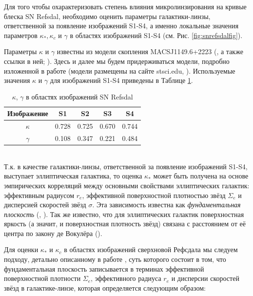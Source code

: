 Для того чтобы охарактеризовать степень влияния микролинзирования на кривые блеска SN Refsdal, необходимо оценить параметры галактики-линзы, ответственной за появление изображений S1-S4, а именно локальные значения параметров $\kappa_*, \kappa_c$ и $\gamma$ в областях изображений S1-S4  (см. Рис. \ref{fig:snrefsdalfig}). 

Параметры $\kappa$ и $\gamma$ известны из модели скопления MACSJ1149.6+2223 (\cite{treu2015}, а также ссылки в ней; \cite{hubblemaps}). Здесь и далее мы будем придерживаться модели, подробно изложенной в работе \cite{kawamataoguri} (модели размещены на сайте stsci.edu, \cite{hlsp}). Используемые значения $\kappa$ и $\gamma$ для изображений S1-S4 приведены в Таблице \ref{tab:kappagamma}.

\begin{table}[h!]
  \caption{$\kappa$, $\gamma$ в областях изображений SN Refsdal}
  \label{tab:kappagamma}
  \centering
    \begin{tabular}{ | c | c | c | c | c |}
    \hline
    Изображение & S1 & S2 & S3 & S4 \\ \hline
    $\kappa$ & 0.728 & 0.725 & 0.670 & 0.744 \\ \hline
    $\gamma$ & 0.108 & 0.347 & 0.221 & 0.484 \\
    \hline
    \end{tabular}
\end{table}
\\
Т.к. в качестве галактики-линзы, ответственной за появление изображений S1-S4, выступает эллиптическая галактика, то оценка $\kappa_*$ может быть получена на основе эмпирических корреляций между основными свойствами эллиптических галактик: эффективным радиусом $r_e$, эффективной поверхностной плотностью звёзд $\Sigma_e$ и дисперсией скоростей звёзд $\sigma$. Эта зависимость известна как \textit{фундаментальная плоскость} (\cite{djorgovski&davis1987}, \cite{hydebernardi2009}). Так же известно, что для эллиптических галактик поверхностная яркость (а значит, и поверхностная плотность звёзд) связана с расстоянием от её центра по закону де Вокулёра (\cite{vaucouleurs}).

Для оценки $\kappa_*$ и $\kappa_c$ в областях изображений сверхновой Рефсдала мы следуем подходу, детально описанному в работе \cite{schechter2014}, суть которого состоит в том, что фундаментальная плоскость записывается в терминах эффективной поверхностной плотности $\Sigma_{e}$, эффективного радиуса $r_e$ и дисперсии скоростей звёзд в галактике-линзе, которая определяется следующим образом:

